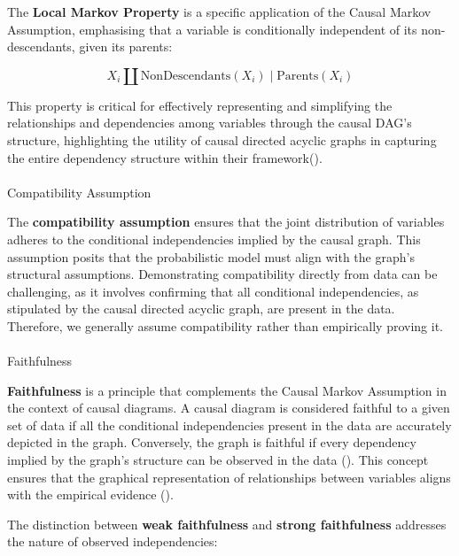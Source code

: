 \documentclass[
  single column]{article}
\makeatletter
\let\oldparagraph\paragraph
\renewcommand{\paragraph}{
    \@ifstar
      \xxxParagraphStar
      \xxxParagraphNoStar
  }
\newcommand{\xxxParagraphStar}[1]{\oldparagraph*{#1}\mbox{}}
\newcommand{\xxxParagraphNoStar}[1]{\oldparagraph{#1}\mbox{}}
\makeatother
\begin{document}
The \textbf{Local Markov Property} is a specific application of the
Causal Markov Assumption, emphasising that a variable is conditionally
independent of its non-descendants, given its parents:

\[
X_i \coprod \text{NonDescendants}(X_i) \mid \text{Parents}(X_i)
\]

This property is critical for effectively representing and simplifying
the relationships and dependencies among variables through the causal
DAG's structure, highlighting the utility of causal directed acyclic
graphs in capturing the entire dependency structure within their
framework().

\paragraph{Compatibility Assumption}\label{compatibility-assumption}

The \textbf{compatibility assumption} ensures that the joint
distribution of variables adheres to the conditional independencies
implied by the causal graph. This assumption posits that the
probabilistic model must align with the graph's structural assumptions.
Demonstrating compatibility directly from data can be challenging, as it
involves confirming that all conditional independencies, as stipulated
by the causal directed acyclic graph, are present in the data.
Therefore, we generally assume compatibility rather than empirically
proving it.

\paragraph{Faithfulness}\label{faithfulness}

\textbf{Faithfulness} is a principle that complements the Causal Markov
Assumption in the context of causal diagrams. A causal diagram is
considered faithful to a given set of data if all the conditional
independencies present in the data are accurately depicted in the graph.
Conversely, the graph is faithful if every dependency implied by the
graph's structure can be observed in the data
(). This concept ensures
that the graphical representation of relationships between variables
aligns with the empirical evidence ().

The distinction between \textbf{weak faithfulness} and \textbf{strong
faithfulness} addresses the nature of observed independencies:
\end{document}
